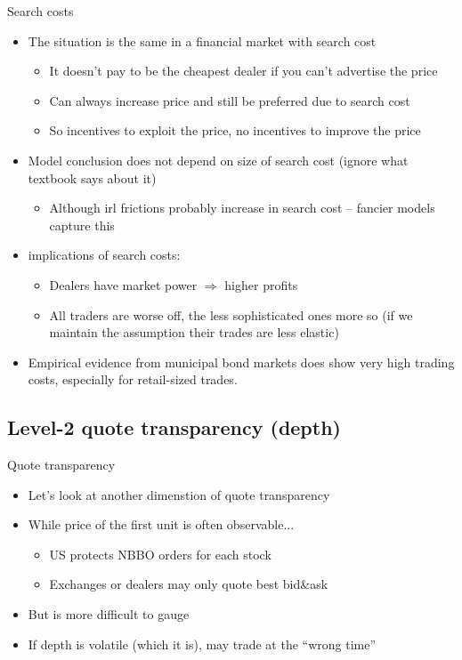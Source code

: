 \documentclass[english,10pt
,aspectratio=169
]{beamer}
\begin{document}
\begin{frame}{Search costs}
	\begin{itemize}
		\item The situation is the same in a financial market with search cost
		\begin{itemize}
			\item It doesn't pay to be the cheapest dealer if you can't advertise the price
			\item Can always increase price and still be preferred due to search cost
			\item So incentives to exploit the price, no incentives to improve the price
		\end{itemize}
		\item Model conclusion does not depend on size of search cost (ignore what textbook says about it)
		\begin{itemize}
			\item Although irl frictions probably increase in search cost -- fancier models capture this
		\end{itemize}
		\item {} implications of search costs:
		\begin{itemize}
			\item \alert{Dealers} have market power $\Rightarrow$ \alert{higher profits}
			\item All \alert{traders are worse off}, the less sophisticated ones more so (if we maintain the assumption their trades are less elastic)
		\end{itemize}
		\item Empirical evidence from municipal bond markets does show very high trading costs, especially for retail-sized trades.
	\end{itemize}
\end{frame}


\subsection{Level-2 quote transparency (depth)}

\begin{frame}{Quote transparency}
	\begin{itemize}
		\item Let's look at another dimenstion of quote transparency
		\item While price of the first unit is often observable...
		\begin{itemize}
			\item US protects NBBO orders for each stock
			\item Exchanges or dealers may only quote best bid\&ask
		\end{itemize}
		\item But  is more difficult to gauge
		\item If depth is volatile (which it is), may trade at the ``wrong time''
	\end{itemize}
\end{frame}
\end{document}
